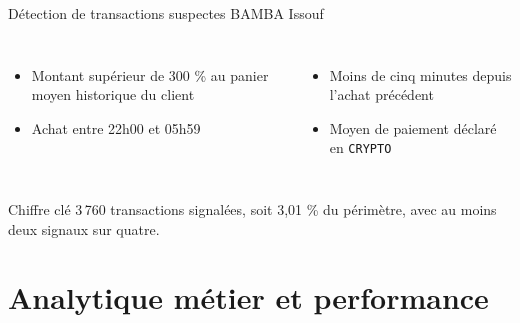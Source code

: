 \documentclass[aspectratio=169,11pt]{beamer}
\newcommand{\legende}[1]{{\color{gris}\footnotesize #1}}
\begin{document}
\begin{frame}{Détection de transactions suspectes}
  \legende{BAMBA Issouf}

  \vspace{3mm}
  \begin{columns}[t,onlytextwidth]
      \begin{itemize}\itemsep2.5mm
        \item Montant supérieur de 300 \% au panier moyen historique du client
        \item Achat entre 22h00 et 05h59
      \end{itemize}
      \begin{itemize}\itemsep2.5mm
        \item Moins de cinq minutes depuis l'achat précédent
        \item Moyen de paiement déclaré en \texttt{CRYPTO}
      \end{itemize}
  \end{columns}

  \vspace{6mm}
  \begin{block}{Chiffre clé}
    3\,760 transactions signalées, soit 3,01 \% du périmètre, avec au moins
    deux signaux sur quatre.
  \end{block}

\end{frame}

\section{Analytique métier et performance}
\end{document}
